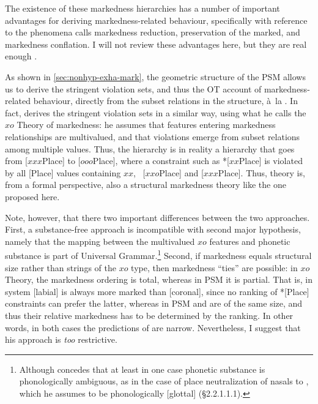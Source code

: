 The existence of these markedness hierarchies has a number of important advantages for deriving markedness\hyp related behaviour, specifically with reference to the phenomena \citet{delacy2006} calls markedness reduction, preservation of the marked, and markedness conflation. I will not review these advantages here, but they are real enough \citep[\cf also][]{causley99:_compl_optim_theor,rice03:_featur}.

As shown in \cref{sec:nonhyp-exha-mark}, the geometric structure of the PSM allows us to derive the stringent violation sets, and thus the OT account of markedness\hyp related behaviour, directly from the subset relations in the structure, à~la \citet{causley99:_compl_optim_theor}. In fact, \citet{delacy2006} derives the stringent violation sets in a similar way, using what he calls the $xo$ Theory of markedness: he assumes that features entering markedness relationships are multivalued, and that violations emerge from subset relations among multiple values. Thus, the hierarchy \dom{[dors]}{\dom{[lab]}{\dom{[cor]}{[gl]}}} is in reality a hierarchy that goes from [$xxx$Place] to [$ooo$Place], where a constraint such as *[$xx$Place] is violated by all [Place] values containing $xx$, \ie\ [$xxo$Place] and [$xxx$Place]. Thus,  theory is, from a formal perspective, also a structural markedness theory like the one proposed here.

Note, however, that there two important differences between the two approaches. First, a substance\hyp free approach is incompatible with  second major hypothesis, namely that the mapping between the multivalued $xo$ features and phonetic substance is part of Universal Grammar.\footnote{Although \citet{delacy2006} concedes that at least in one case phonetic substance is phonologically ambiguous, as in the case of place neutralization of nasals to , which he assumes to be phonologically [glottal] (§2.2.1.1.1).} Second, if markedness equals structural size rather than strings of the $xo$ type, then markedness \enquote{ties} are possible: in $xo$ Theory, the markedness ordering is total, whereas in PSM it is partial. That is, in  system [labial] is always more marked than [coronal], since no ranking of *[Place] constraints can prefer the latter, whereas in PSM  and  are of the same size, and thus their relative markedness has to be determined by the ranking. In other words, in both cases the predictions of \citet{delacy2006} are narrow. Nevertheless, I suggest that his approach is \emph{too} restrictive.

